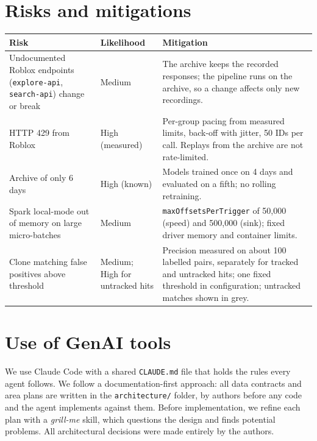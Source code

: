 \documentclass[10pt,a4paper]{article}
\newcommand{\ep}[1]{\texttt{\small #1}}
\begin{document}
\section{Risks and mitigations}\label{sec:risks}

{\small
\begin{tabularx}{\textwidth}{L{4.2cm} L{2.0cm} Y}
\toprule
\textbf{Risk} & \textbf{Likelihood} & \textbf{Mitigation}\\
\midrule
Undocumented Roblox endpoints (\ep{explore-api}, \ep{search-api}) change or break & Medium & The archive keeps the recorded responses; the pipeline runs on the archive, so a change affects only new recordings.\\
HTTP 429 from Roblox & High (measured) & Per-group pacing from measured limits, back-off with jitter, 50 IDs per call. Replays from the archive are not rate-limited.\\
Archive of only 6 days & High (known) & Models trained once on 4 days and evaluated on a fifth; no rolling retraining.\\
Spark local-mode out of memory on large micro-batches & Medium & \ep{maxOffsetsPerTrigger} of 50,000 (speed) and 500,000 (sink); fixed driver memory and container limits.\\
Clone matching false positives above threshold & Medium; High for untracked hits & Precision measured on about 100 labelled pairs, separately for tracked and untracked hits; one fixed threshold in configuration; untracked matches shown in grey.\\
\bottomrule
\end{tabularx}}

\section{Use of GenAI tools}\label{sec:genai}
We use Claude Code with a shared \ep{CLAUDE.md} file that holds the rules every agent follows. We follow a documentation-first approach: all data contracts and area plans are written in the \ep{architecture/} folder, by authors before any code and the agent implements against them. Before implementation, we refine each plan with a \emph{grill-me} skill, which questions the design and finds potential problems. All architectural decisions were made entirely by the authors.
\end{document}
